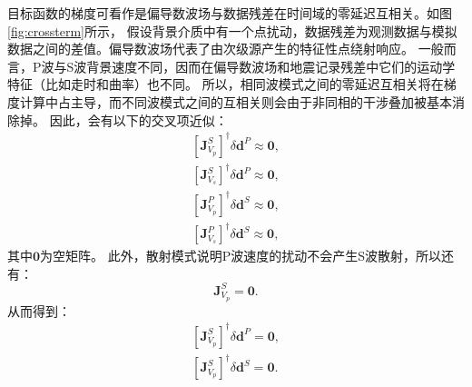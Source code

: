 目标函数的梯度可看作是偏导数波场与数据残差在时间域的零延迟互相关\cite[]{pratt1998gauss}。如图\ref{fig:crossterm}所示，
假设背景介质中有一个点扰动，数据残差为观测数据与模拟数据之间的差值。偏导数波场代表了由次级源产生的特征性点绕射响应。
一般而言，P波与S波背景速度不同，因而在偏导数波场和地震记录残差中它们的运动学特征（比如走时和曲率）也不同。
所以，相同波模式之间的零延迟互相关将在梯度计算中占主导，而不同波模式之间的互相关则会由于非同相的干涉叠加被基本消除掉。
因此，会有以下的交叉项近似：
\begin{equation}
        \begin{split}
                [\mathbf{J}_{V_p}^{S}]^{\dagger}\delta \mathbf{d}^P\approx\mathbf{0},\\
                [\mathbf{J}_{V_s}^{S}]^{\dagger}\delta \mathbf{d}^P\approx\mathbf{0},\\
                [\mathbf{J}_{V_p}^{P}]^{\dagger}\delta \mathbf{d}^S\approx\mathbf{0},\\
                [\mathbf{J}_{V_s}^{P}]^{\dagger}\delta \mathbf{d}^S\approx\mathbf{0},
        \end{split}
        \label{eq:crossterms}
\end{equation}
其中$\mathbf{0}$为空矩阵。
此外，散射模式说明P波速度的扰动不会产生S波散射，所以还有：
\begin{equation}
\mathbf{J}^S_{V_p}=\mathbf{0}.
\label{eq:Jsvp}
\end{equation}
从而得到：
\begin{equation}
        \begin{split}
[\mathbf{J}^S_{V_p}]^{\dagger}\delta \mathbf{d}^P=\mathbf{0}, \\
[\mathbf{J}^S_{V_p}]^{\dagger}\delta \mathbf{d}^S=\mathbf{0}.
        \end{split}
\label{eq:Jsvp1}
\end{equation}
